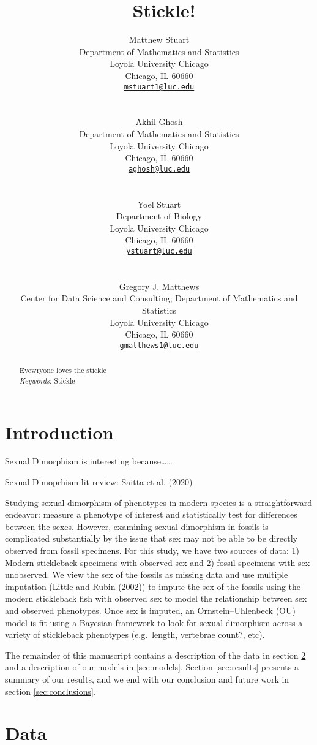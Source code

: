 \documentclass[
  12pt,
]{article}
\title{~\Large Stickle!}
\author{\large Matthew Stuart \vspace{-1.1mm}\\
\normalsize Department of Mathematics and Statistics \vspace{-1.1mm}\\
\normalsize Loyola University Chicago \vspace{-1.1mm}\\
\normalsize Chicago, IL 60660 \vspace{-1.1mm}\\
\normalsize \href{mailto:mstuart1@luc.edu}{\texttt{mstuart1@luc.edu}}
\vspace{-1.1mm}\\
\strut \\
\large Akhil Ghosh \vspace{-1.1mm}\\
\normalsize Department of Mathematics and Statistics \vspace{-1.1mm}\\
\normalsize Loyola University Chicago \vspace{-1.1mm}\\
\normalsize Chicago, IL 60660 \vspace{-1.1mm}\\
\normalsize \href{mailto:aghosh@luc.edu}{\texttt{aghosh@luc.edu}}
\vspace{-1.1mm}\\
\strut \\
\large Yoel Stuart \vspace{-1.1mm}\\
\normalsize Department of Biology \vspace{-1.1mm}\\
\normalsize Loyola University Chicago \vspace{-1.1mm}\\
\normalsize Chicago, IL 60660 \vspace{-1.1mm}\\
\normalsize \href{mailto:ystuart@luc.edu}{\texttt{ystuart@luc.edu}}
\vspace{-1.1mm}\\
\strut \\
\large Gregory J. Matthews \vspace{-1.1mm}\\
\normalsize Center for Data Science and Consulting; Department of
Mathematics and Statistics \vspace{-1.1mm}\\
\normalsize Loyola University Chicago \vspace{-1.1mm}\\
\normalsize Chicago, IL 60660 \vspace{-1.1mm}\\
\normalsize \href{mailto:gmatthews1@luc.edu}{\texttt{gmatthews1@luc.edu}}
\vspace{-1.1mm}}
\date{}
\begin{document}
\maketitle
\begin{abstract}
Evewryone loves the stickle \vspace{2mm}\\
\emph{Keywords}: Stickle
\end{abstract}

\newcommand{\iid}{\overset{iid}{\sim}}

\newpage

\hypertarget{sec:intro}{%
\section{Introduction}\label{sec:intro}}

Sexual Dimorphism is interesting because\ldots\ldots{}

Sexual Dimoprhism lit review: Saitta et al.
(\protect\hyperlink{ref-SaittaEtAl2020}{2020})

Studying sexual dimorphism of phenotypes in modern species is a
straightforward endeavor: measure a phenotype of interest and
statistically test for differences between the sexes. However, examining
sexual dimorphism in fossils is complicated substantially by the issue
that sex may not be able to be directly observed from fossil specimens.
For this study, we have two sources of data: 1) Modern stickleback
specimens with observed sex and 2) fossil specimens with sex unobserved.
We view the sex of the fossils as missing data and use multiple
imputation (Little and Rubin
(\protect\hyperlink{ref-little2002statistical}{2002})) to impute the sex
of the fossils using the modern stickleback fish with observed sex to
model the relationship between sex and observed phenotypes. Once sex is
imputed, an Ornstein--Uhlenbeck (OU) model is fit using a Bayesian
framework to look for sexual dimorphism across a variety of stickleback
phenotypes (e.g.~length, vertebrae count?, etc).

The remainder of this manuscript contains a description of the data in
section \ref{sec:data} and a description of our models in
\ref{sec:models}. Section \ref{sec:results} presents a summary of our
results, and we end with our conclusion and future work in section
\ref{sec:conclusions}.

\hypertarget{sec:data}{%
\section{Data}\label{sec:data}}
\end{document}
